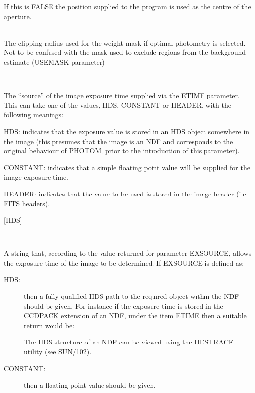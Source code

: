 \documentclass[twoside,11pt]{article}
\newcommand{\xref}[3]{#1}
\renewcommand{\_}{\texttt{\symbol{95}}}
\newcommand{\sstsubsection}[1]{ \item[{#1}] \mbox{} \\}
\newcommand{\sstsubsection}[1]{\item[{#1}]}
\begin{document}
{{{         If this is FALSE the position supplied to the program is used
         as the centre of the aperture.
      }
      \sstsubsection{
         CLIP = \_REAL (Read)
      }{
         The clipping radius used for the weight mask if optimal photometry
         is selected. Not to be confused with the mask used to exclude
         regions from the background estimate (USEMASK parameter)
      }    
      \sstsubsection{
         EXSOURCE = LITERAL (Read)
      }{
        The ``source'' of the image exposure time supplied via the ETIME
        parameter. This can take one of the values, HDS, CONSTANT or
        HEADER, with the following meanings:
        \begin{description}
        \item{HDS:} indicates that the exposure value is stored in an HDS
          object somewhere in the image (this presumes that the image is
          an NDF and corresponds to the original behaviour of PHOTOM,
          prior to the introduction of this parameter).
        \item{CONSTANT:} indicates that a simple floating point value will be
          supplied for the image exposure time.
        \item{HEADER:} indicates that the value to be used is stored in the
          image header (i.e. FITS headers).
        \end{description}
        [HDS]
      }
      \sstsubsection{
         ETIME = LITERAL (Read)
      }{
        A string that, according to the value returned for parameter
        EXSOURCE, allows the exposure time of the image to be
        determined. If EXSOURCE is defined as:
        \begin{description}
          \item[HDS:] then a fully qualified HDS path to the required object
            within the NDF should be given. For instance if the exposure
            time is stored in the CCDPACK extension of an NDF, under the
            item ETIME then a suitable return would be:
            The HDS structure of an NDF can be viewed using the HDSTRACE
            utility (see \xref{SUN/102}{sun102}{}).

          \item[CONSTANT:] then a floating point value should be given.


\end{description}}}}
\end{document}
